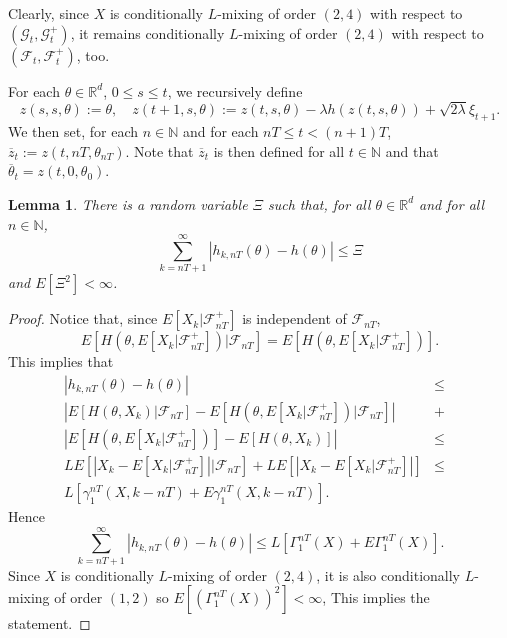 \documentclass[a4paper,draft]{article}
\newtheorem{lemma}[theorem]{Lemma}
\begin{document}
Clearly, since
$X$ is conditionally $L$-mixing of order $(2,4)$ with respect to
$(\mathcal{G}_t,\mathcal{G}^+_t)$, it remains
conditionally $L$-mixing of order $(2,4)$ with respect to
$(\mathcal{F}_t,\mathcal{F}^+_t)$, too.

For each $\theta\in\mathbb{R}^d$, $0\leq s\leq t$, we recursively define
$$
z(s,s,\theta):=\theta,\quad z(t+1,s,\theta):=z(t,s,\theta)
-\lambda h(z(t,s,\theta))+\sqrt{2\lambda}\xi_{t+1}.
$$
We then set, for each $n\in\mathbb{N}$ and for each
$nT\leq t<(n+1)T$, $\overline{z}_t:=z(t,nT,\theta_{nT})$.
Note that $\overline{z}_t$ is then defined for all $t\in\mathbb{N}$
and that $\overline{\theta}_t=z(t,0,\theta_0)$.

\begin{lemma}\label{kaaka}
There is a random variable $\Xi$ such that, for all $\theta\in\mathbb{R}^d$
and for all $n\in\mathbb{N}$,
$$
\sum_{k=nT+1}^{\infty}|h_{k,nT}(\theta)-h(\theta)|\leq \Xi
$$
and $E[\Xi^2]<\infty$.
\end{lemma}
\begin{proof}
Notice that, since $E[X_k\vert\mathcal{F}_{nT}^+]$ is independent
of $\mathcal{F}_{nT}$,
$$
E[H(\theta,E[X_k\vert\mathcal{F}_{nT}^+])\vert\mathcal{F}_{nT}]=
E[H(\theta, E[X_k\vert\mathcal{F}_{nT}^+])].
$$
This implies that
\begin{eqnarray*}
|h_{k,nT}(\theta)-h(\theta)| &\leq&\\
\left|E[H(\theta,X_k)|\mathcal{F}_{nT}]-
E[H(\theta,E[X_k\vert\mathcal{F}_{nT}^+])\vert\mathcal{F}_{nT}]\right|
&+&\\
\left|E[H(\theta, E[X_k\vert\mathcal{F}_{nT}^+])]-E[H(\theta,X_k)]\right| &\leq&\\
LE[|X_k-E[X_k\vert\mathcal{F}_{nT}^+]|\vert\mathcal{F}_{nT}]
+LE[|X_k-E[X_k\vert\mathcal{F}_{nT}^+]|] &\leq&\\
L[\gamma_1^{nT}(X,k-nT) + E\gamma_1^{nT}(X,k-nT)]. & &
\end{eqnarray*}
Hence
$$
\sum_{k=nT+1}^{\infty}|h_{k,nT}(\theta)-h(\theta)|\leq L[\Gamma_1^{nT}(X)
+E\Gamma_1^{nT}(X)].
$$
Since $X$ is conditionally $L$-mixing of order $(2,4)$, it is also
conditionally $L$-mixing of order $(1,2)$ so
$E[(\Gamma_1^{nT}(X))^2]<\infty$, This implies the statement.
\end{proof}
\end{document}
